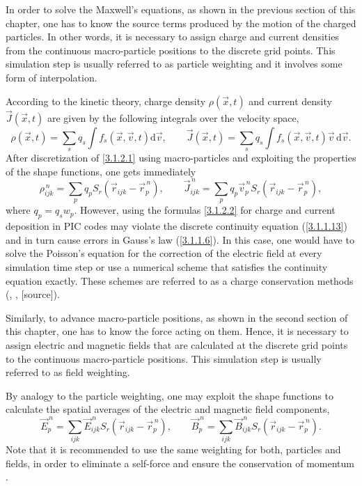 In order to solve the Maxwell's equations, as shown in the previous section of this chapter, one has to know the source terms produced by the motion of the charged particles. In other words, it is necessary to assign charge and current densities from the continuous macro-particle positions to the discrete grid points. This simulation step is usually referred to as particle weighting and it involves some form of interpolation.
 
According to the kinetic theory, charge density $ \rho\left(\vec{x}, t \right) $ and current density $ \vec{J}\left(\vec{x}, t \right) $ are given by the following integrals over the velocity space,
\begin{equation}
\label{3.1.2.1}
\rho\left(\vec{x}, t \right) = \sum_s q_s \int f_s \left(\vec{x}, \vec{v}, t \right) \mathrm{d} \vec{v}, \qquad \vec{J}\left(\vec{x}, t \right) = \sum_s q_s \int f_s \left(\vec{x}, \vec{v}, t \right) \vec{v} \, \mathrm{d} \vec{v}.
\end{equation}
After discretization of \ref{3.1.2.1} using macro-particles and exploiting the properties of the shape functions, one gets immediately
\begin{equation}
\label{3.1.2.2}
\rho_{ijk}^{\,n} = \sum_{p} q_p S_{r}\left(\vec{r}_{ijk} - \vec{r}_{p}^{\,n}\right), \qquad \vec{J}_{ijk}^{\,n} = \sum_{p} q_p \vec{v}_p^{\,n} S_{r}\left(\vec{r}_{ijk} - \vec{r}_{p}^{\,n}\right),
\end{equation}
where $ q_p = q_s w_p $. However, using the formulas \ref{3.1.2.2} for charge and current deposition in PIC codes may violate the discrete continuity equation (\ref{3.1.1.13}) and in turn cause errors in Gauss's law (\ref{3.1.1.6}). In this case, one would have to solve the Poisson's equation for the correction of the electric field at every simulation time step or use a numerical scheme that satisfies the continuity equation exactly. These schemes are referred to as a charge conservation methods (\cite{villasenor}, \cite{esirkepov}, [source]).

Similarly, to advance macro-particle positions, as shown in the second section of this chapter, one has to know the force acting on them. Hence, it is necessary to assign electric and magnetic fields that are calculated at the discrete grid points to the continuous macro-particle positions. This simulation step is usually referred to as field weighting.

By analogy to the particle weighting, one may exploit the shape functions to calculate the spatial averages of the electric and magnetic field components,
\begin{equation}
\vec{E}_{p}^{\,n} = \sum_{ijk} \vec{E}_{ijk}^{\,n} S_{r}\left(\vec{r}_{ijk} - \vec{r}_{p}^{\,n}\right), \qquad \vec{B}_{p}^{\,n} = \sum_{ijk} \vec{B}_{ijk}^{\,n} S_{r}\left(\vec{r}_{ijk} - \vec{r}_{p}^{\,n}\right).
\end{equation}
Note that it is recommended to use the same weighting for both, particles and fields, in order to eliminate a self-force and ensure the conservation of momentum \cite{fehske}.

